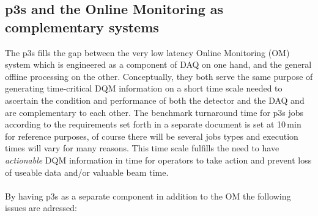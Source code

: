 \documentclass[pdftex,12pt,letter]{article}
\begin{document}
\subsection{p3s and the Online Monitoring as complementary systems}
The p3s fills the gap between the very low latency Online Monitoring (OM)
system which is engineered as a component of DAQ on one hand, and
the general offline processing on the other. Conceptually, they both serve
the same purpose of generating time-critical DQM information on a short time
scale needed to ascertain the condition and performance of both the detector
and the DAQ and are complementary to each other. 
The benchmark turnaround time for p3s jobs 
according to the requirements set forth in a separate document 
\cite{docdb1811}  is set at 10\,min for reference purposes,
of course there will be several jobs types and execution times will
vary for many reasons. This time scale fulfills the need to have \textit{actionable}
DQM information in time for operators to take action and prevent loss
of useable data and/or valuable beam time.
\ \\
\\
\noindent By having p3s as a separate 
component in addition to the OM the following issues are adressed:
\end{document}
